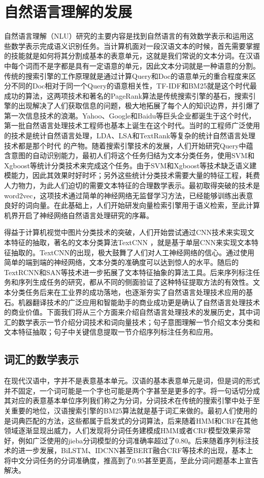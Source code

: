 \documentclass[twoside,a4paper,12pt]{book}%
\begin{document}
\section{自然语言理解的发展}
自然语言理解（\gls{NLU}）研究的主要内容是找到自然语言的有效数学表示和运用这些数学表示完成语义识别任务。当计算机面对一段汉语文本的时候，首先需要掌握的技能就是如何将其分割成基本的表意单元，这就是我们常说的文本分词。在汉语中每个词而不是字都是具有一定语意的单元，因此文本分词就是一种语意的分割。传统的搜索引擎的工作原理就是通过计算Query和Doc的语意单元的重合程度来区分不同的Doc相对于同一个Query的语意相关性，TF-IDF和BM25就是这个时代最成功的算法，这两项技术和著名的PageRank算法是传统搜索引擎的基石，搜索引擎的出现解决了人们获取信息的问题，极大地拓展了每个人的知识边界，并引爆了第一次信息技术的浪潮。Yahoo、Google和Baidu等巨头企业都诞生于这个时代，第一批自然语言处理技术工程师也基本上诞生在这个时代。当时的工程师广泛使用的技术是统计自然语言处理，\gls{LDA}、\gls{LSA}和TextRank等复杂的统计自然语言处理技术都是那个时代
的产物。随着搜索引擎技术的发展，人们开始研究Query中蕴含意图的自动识别能力，最初人们将这个任务归结为文本分类任务，使用\gls{SVM}和Xgboost等统计分类技术来完成这个任务。由于\gls{SVM}和Xgboost等技术缺乏语义建模能力，因此其效果时好时坏；另外这些统计分类技术需要大量的特征工程，耗费人力物力，为此人们迫切的需要文本特征的合理数学表示。最初取得突破的技术是word2vec，这项技术通过简单的神经网络无监督学习方法，已经能够训练出表意良好的词向量。在此基础上，人们开始研发向量检索引擎用于语义检索，至此计算机界开启了神经网络自然语言处理研究的序幕。

得益于计算机视觉中图片分类技术的突破，人们开始尝试通过\gls{CNN}技术来实现文本特征的抽取，著名的文本分类算法TextCNN ，就是基于单层\gls{CNN}来实现文本特征抽取的。TextCNN的出现，极大鼓舞了人们对人工神经网络的信心。通过使用简单的端到端的神经网络，文本分类的准确度可以达到惊人的水平。随后的TextRCNN和\gls{SAN}等技术进一步拓展了文本特征抽象的算法工具。后来序列标注任务和序列生成任务的研究，都从不同的侧面验证了这种特征提取方法的有效性。文本分类任务后来在工业界的成功落地，也逐渐夯实了自然语言处理技术应用的基石。机器翻译技术的广泛应用和智能助手的商业成功更是确认了自然语言处理技术的商业价值。下面我们将从三个方面来介绍自然语言处理技术的发展历史，其中词汇的数学表示一节介绍分词技术和词向量技术；句子意图理解一节介绍文本分类和文本特征抽取；句子中关键信息提取一节介绍序列标注任务和应用。

\subsection{词汇的数学表示}
在现代汉语中，字并不是表意基本单元。汉语的基本表意单元是词，但是词的形式并不固定，一个词可能是一个字也可能是两个字甚至是更多的字。将一句话切分成其对应的表意基本单位序列我们称之为分词，分词技术在传统的搜索引擎中处于至关重要的地位，汉语搜索引擎的BM25算法就是基于词汇来做的。最初人们使用的是词典匹配的方法，这些都属于启发式的分词算法，后来随着\gls{HMM}和\gls{CRF}在其他领域逐渐显现出威力，人们发现将分词任务建模成\gls{HMM}或者\gls{CRF}模型效果非常好，例如广泛使用的jieba分词模型的分词准确率超过了$0.80$。后来随着序列标注技术的进一步发展，Bi\gls{LSTM}、\gls{IDCNN}甚至\gls{BERT}融合\gls{CRF}等技术的出现，基本上将中文分词任务的分词准确度，推高到了$0.95$甚至更高，至此分词问题基本上宣告解决。
\end{document}
